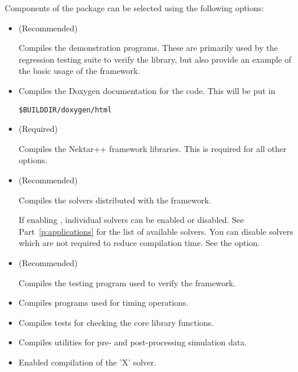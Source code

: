 Components of the \nekpp package can be selected using the following options:
\begin{itemize}
    \item {} (Recommended)
    
    Compiles the demonstration programs. These are primarily used by the
    regression testing suite to verify the \nekpp library, but also provide an
    example of the basic usage of the framework.

    \item {}

    Compiles the Doxygen documentation for the code. This will be put in
    \begin{lstlisting}[style=BashInputStyle]
    $BUILDDIR/doxygen/html
    \end{lstlisting}

    \item {} (Required)
    
    Compiles the Nektar++ framework libraries. This is required for all other
    options.

    \item {} (Recommended)
    
    Compiles the solvers distributed with the \nekpp framework.

    If enabling , individual solvers can be
    enabled or disabled. See Part~\ref{p:applications} for the list of available
    solvers. You can disable solvers which are not required to reduce
    compilation time. See the  option.

    \item {} (Recommended)

    Compiles the testing program used to verify the \nekpp framework.

    \item {}

    Compiles programs used for timing \nekpp operations.

    \item {}

    Compiles tests for checking the core library functions.

    \item {}

    Compiles utilities for pre- and post-processing simulation data.
    
    \item {}
    
    Enabled compilation of the 'X' solver.
\end{itemize}

